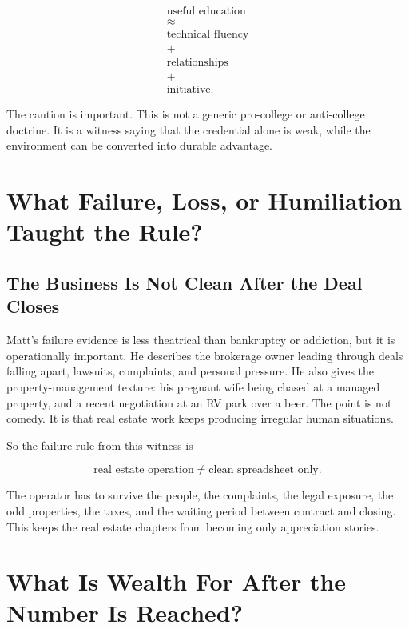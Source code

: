 \documentclass[11pt,oneside]{book}
\begin{document}
\begin{equation}
\begin{gathered}
\text{useful education}\\
\approx\\
\text{technical fluency}\\
+\\
\text{relationships}\\
+\\
\text{initiative}.
\end{gathered}
\end{equation}

The caution is important. This is not a generic pro-college or anti-college doctrine. It is a witness saying that the credential alone is weak, while the environment can be converted into durable advantage.

\chapter{What Failure, Loss, or Humiliation Taught the Rule?}

\section{The Business Is Not Clean After the Deal Closes}

Matt's failure evidence is less theatrical than bankruptcy or addiction, but it is operationally important. He describes the brokerage owner leading through deals falling apart, lawsuits, complaints, and personal pressure. He also gives the property-management texture: his pregnant wife being chased at a managed property, and a recent negotiation at an RV park over a beer. The point is not comedy. It is that real estate work keeps producing irregular human situations.

So the failure rule from this witness is

\begin{equation}
\text{real estate operation}
\neq
\text{clean spreadsheet only}.
\end{equation}

The operator has to survive the people, the complaints, the legal exposure, the odd properties, the taxes, and the waiting period between contract and closing. This keeps the real estate chapters from becoming only appreciation stories.

\chapter{What Is Wealth For After the Number Is Reached?}
\end{document}
